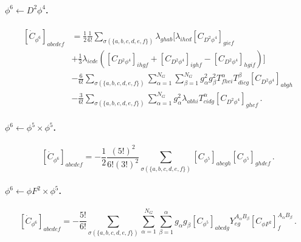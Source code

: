 \paragraph{\texorpdfstring{$\phi^6 \leftarrow D^2\phi^4$.}{phi6fromD2phi4}}
\label{par:phi6<-D2phi4}

\begin{align}
    \left[\dot C_{\phi^6}\right]_{abcdef} &= \frac{1}{2}\frac{1}{6!}\sum_{\sigma(\{a,b,c,d,e,f\})}\lambda_{ghab}\bigg[\lambda_{ihcd}\left[ C_{D^2\phi^4}\right]_{gief}\nonumber\\
    &+\frac{1}{3}\lambda_{icde}\left(\left[C_{D^2\phi^4}\right]_{ihgf}+\left[C_{D^2\phi^4}\right]_{ighf}-\left[C_{D^2\phi^4}\right]_{hgif}\right)\bigg]\nonumber\\
    &- \frac{6}{6!} \sum_{\sigma(\{a,b,c,d,e,f\})}\sum_{\alpha=1}^{N_G}\sum_{\beta=1}^{N_G} g_\alpha^2 g_\beta^2 T^\alpha_{fhei} T^\beta_{dicg}\left[C_{D^2\phi^4}\right]_{abgh}\nonumber\\
    &-\frac{3}{6!} \sum_{\sigma(\{a,b,c,d,e,f\})}\sum_{\alpha=1}^{N_G} g_\alpha^2 \lambda_{abhi} T^\alpha_{cidg} \left[C_{D^2\phi^4}\right]_{ghef}\,.
    \label{eq:phi6<-D2phi4}
\end{align}

\paragraph{\texorpdfstring{$\phi^6 \leftarrow \phi^5\times\phi^5$.}{phi6fromphi5xphi5}}
\label{par:phi6<-phi5xphi5}

\begin{equation}
    \left[\dot C_{\phi^6}\right]_{abcdef} = -\frac{1}{2}\frac{(5!)^2}{6!(3!)^2}\sum_{\sigma(\{a,b,c,d,e,f\})}\left[ C_{\phi^5}\right]_{abcgh}\left[ C_{\phi^5}\right]_{ghdef}\,.
\end{equation}

\paragraph{\texorpdfstring{$\phi^6 \leftarrow \phi F^2\times\phi^5$.}{phi6fromphiF2xphi5}}
\label{par:phi6<-phiF2xphi5}

\begin{equation}
    \left[\dot C_{\phi^6}\right]_{abcdef} = -\frac{5!}{6!}\sum_{\sigma(\{a,b,c,d,e,f\})} \sum_{\alpha=1}^{N_G} \sum_{\beta=1}^{\alpha} g_\alpha g_\beta \left[C_{\phi^5}\right]_{abcdg} Y_{eg}^{A_\alpha B_\beta} \left[C_{\phi F^2}\right]_{f}^{A_\alpha B_\beta}\,.
\end{equation}

